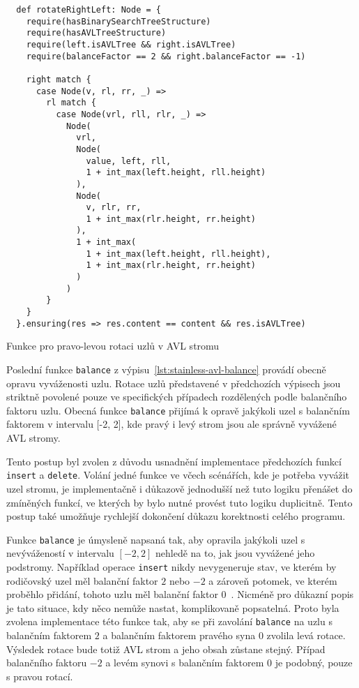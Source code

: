 \begin{listing}[H]
  \begin{verbatim}
  def rotateRightLeft: Node = {
    require(hasBinarySearchTreeStructure)
    require(hasAVLTreeStructure)
    require(left.isAVLTree && right.isAVLTree)
    require(balanceFactor == 2 && right.balanceFactor == -1)

    right match {
      case Node(v, rl, rr, _) =>
        rl match {
          case Node(vrl, rll, rlr, _) =>
            Node(
              vrl,
              Node(
                value, left, rll,
                1 + int_max(left.height, rll.height)
              ),
              Node(
                v, rlr, rr,
                1 + int_max(rlr.height, rr.height)
              ),
              1 + int_max(
                1 + int_max(left.height, rll.height),
                1 + int_max(rlr.height, rr.height)
              )
            )
        }
    }
  }.ensuring(res => res.content == content && res.isAVLTree)
  \end{verbatim}
  \caption{Funkce pro pravo-levou rotaci uzlů v AVL stromu}
  \label{lst:stainless-avl-rotateRightLeft}
\end{listing}

Poslední funkce \texttt{balance} z výpisu~\ref{lst:stainless-avl-balance}
provádí obecně opravu vyváženosti uzlu.
Rotace uzlů představené v předchozích výpisech
jsou striktně povolené pouze ve specifických případech rozdělených podle
balančního faktoru uzlu.
Obecná funkce \texttt{balance} přijímá k opravě jakýkoli uzel s balančním faktorem
v intervalu [-2, 2], kde pravý i levý strom jsou ale správně vyvážené AVL stromy.

Tento postup byl zvolen z důvodu usnadnění implementace předchozích funkcí \texttt{insert} a \texttt{delete}.
Volání jedné funkce ve včech scénářích, kde je potřeba vyvážit uzel stromu,
je implementačně i důkazově jednodušší než tuto logiku přenášet do zmíněných funkcí,
ve kterých by bylo nutné provést tuto logiku duplicitně.
Tento postup také umožňuje rychlejší dokončení důkazu korektnosti celého programu.

Funkce \texttt{balance} je úmysleně napsaná tak, aby opravila
jakýkoli uzel s nevývážeností v intervalu $[-2, 2]$ nehledě na to,
jak jsou vyvážené jeho podstromy.
Například operace \texttt{insert} nikdy nevygeneruje stav,
ve kterém by rodičovský uzel měl balanční faktor $2$ nebo $-2$
a zároveň potomek, ve kterém proběhlo přidání, tohoto uzlu měl balanční faktor $0$~\cite{Pruvodce22}.
Nicméně pro důkazní popis je tato situace,
kdy něco nemůže nastat, komplikovaně popsatelná.
Proto byla zvolena implementace této funkce tak,
aby se při zavolání \texttt{balance} na uzlu s balančním faktorem $2$ a balančním faktorem pravého syna $0$
zvolila levá rotace.
Výsledek rotace bude totiž AVL strom a jeho obsah zůstane stejný.
Případ balančního faktoru $-2$ a levém synovi s balančním faktorem $0$ je podobný,
pouze s pravou rotací.

